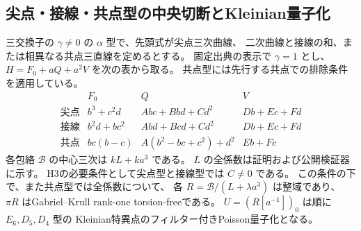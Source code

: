 \subsection{尖点・接線・共点型の中央切断とKleinian量子化}
\label{subsec:cubic-CY-three-alpha-additive}

\begin{proposition}\label{prop:cubic-CY-three-alpha-additive}
三交換子の $\gamma\ne0$ の $\alpha$ 型で、先頭式が尖点三次曲線、
二次曲線と接線の和、または相異なる共点三直線を定めるとする。
固定出典\cite{AS4CYpinned}の表示で $\gamma=1$ とし、
$H=F_0+aQ+a^2V$ を次の表から取る。
共点型には先行する共点での排除条件を適用している。
\[
\begin{array}{c|l|l|l}
 &F_0&Q&V\\ \hline
\text{尖点}&b^3+c^2d&Abc+Bbd+Cd^2&Db+Ec+Fd\\
\text{接線}&b^2d+bc^2&Abd+Bcd+Cd^2&Db+Ec+Fd\\
\text{共点}&bc(b-c)&A(b^2-bc+c^2)+d^2&Eb+Fc
\end{array}
\]
各包絡 $\mathcal B$ の中心三次は $kL+ka^3$ である。
$L$ の全係数は証明および公開検証器に示す。
H3の必要条件として尖点型と接線型では $C\ne0$ である。
この条件の下で、また共点型では全係数について、
各 $R=\mathcal B/(L+\lambda a^3)$ は整域であり、
$\pi R$ はGabriel--Krull rank-one torsion-freeである。
$U=(R[a^{-1}])_0$ は順に $E_6,D_5,D_4$ 型の
Kleinian特異点のフィルター付きPoisson量子化となる。
\end{proposition}
